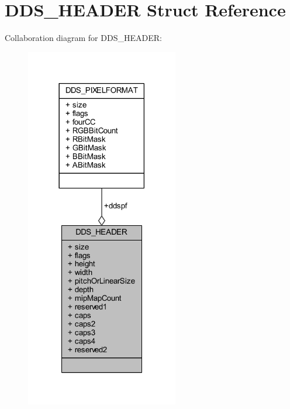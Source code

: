 \hypertarget{struct_d_d_s___h_e_a_d_e_r}{}\section{D\+D\+S\+\_\+\+H\+E\+A\+D\+ER Struct Reference}
\label{struct_d_d_s___h_e_a_d_e_r}


Collaboration diagram for D\+D\+S\+\_\+\+H\+E\+A\+D\+ER\+:\nopagebreak
\begin{figure}[H]
\begin{center}
\leavevmode
\includegraphics[width=189pt]{struct_d_d_s___h_e_a_d_e_r__coll__graph}
\end{center}
\end{figure}
